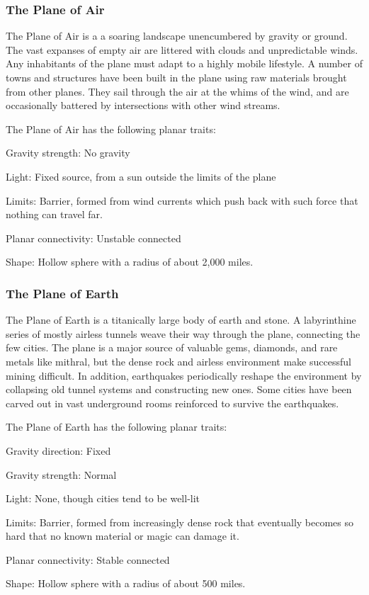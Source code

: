     \subsubsection{The Plane of Air}
      The Plane of Air is a a soaring landscape unencumbered by gravity or ground.
      The vast expanses of empty air are littered with clouds and unpredictable winds.
      Any inhabitants of the plane must adapt to a highly mobile lifestyle.
      A number of towns and structures have been built in the plane using raw materials brought from other planes.
      They sail through the air at the whims of the wind, and are occasionally battered by intersections with other wind streams.

      The Plane of Air has the following planar traits:
      \begin{raggeditemize}
        \item Gravity strength: No gravity
        \item Light: Fixed source, from a sun outside the limits of the plane
        \item Limits: Barrier, formed from wind currents which push back with such force that nothing can travel far.
        \item Planar connectivity: Unstable connected
        \item Shape: Hollow sphere with a radius of about 2,000 miles.
      \end{raggeditemize}

    \subsubsection{The Plane of Earth}
      The Plane of Earth is a titanically large body of earth and stone.
      A labyrinthine series of mostly airless tunnels weave their way through the plane, connecting the few cities.
      The plane is a major source of valuable gems, diamonds, and rare metals like mithral, but the dense rock and airless environment make successful mining difficult.
      In addition, earthquakes periodically reshape the environment by collapsing old tunnel systems and constructing new ones.
      Some cities have been carved out in vast underground rooms reinforced to survive the earthquakes.

      The Plane of Earth has the following planar traits:
      \begin{raggeditemize}
        \item Gravity direction: Fixed
        \item Gravity strength: Normal
        \item Light: None, though cities tend to be well-lit
        \item Limits: Barrier, formed from increasingly dense rock that eventually becomes so hard that no known material or magic can damage it.
        \item Planar connectivity: Stable connected
        \item Shape: Hollow sphere with a radius of about 500 miles.
      \end{raggeditemize}

